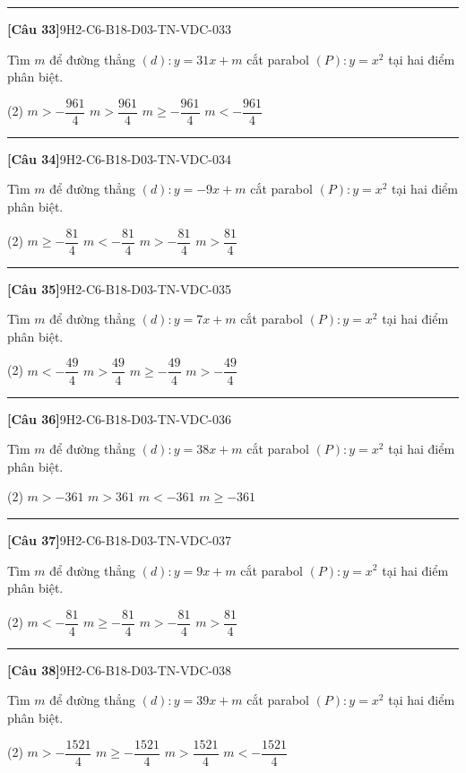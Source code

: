 \documentclass[12pt,a4paper]{article}
\newif\ifloigiai
\newenvironment{cauhoi}[2]{%
  \par\medskip\noindent\rule{\textwidth}{0.4pt}\par\nopagebreak
  \noindent\textbf{[#1]}\hfill{\scriptsize\ttfamily #2}\par\nopagebreak\smallskip}{\par}
\newcommand{\dapan}[1]{\ifloigiai\par\smallskip\noindent\textit{Đáp án:} \textbf{#1}\par\fi}
\begin{document}
\begin{cauhoi}{Câu 33}{9H2-C6-B18-D03-TN-VDC-033}
Tìm $m$ để đường thẳng $(d): y=31x+m$ cắt parabol $(P): y=x^{2}$ tại hai điểm phân biệt.
\begin{tasks}(2)
\task $m>-\dfrac{961}{4}$
\task $m>\dfrac{961}{4}$
\task $m\ge -\dfrac{961}{4}$
\task $m<-\dfrac{961}{4}$
\end{tasks}
\dapan{A}
\end{cauhoi}
\begin{cauhoi}{Câu 34}{9H2-C6-B18-D03-TN-VDC-034}
Tìm $m$ để đường thẳng $(d): y=-9x+m$ cắt parabol $(P): y=x^{2}$ tại hai điểm phân biệt.
\begin{tasks}(2)
\task $m\ge -\dfrac{81}{4}$
\task $m<-\dfrac{81}{4}$
\task $m>-\dfrac{81}{4}$
\task $m>\dfrac{81}{4}$
\end{tasks}
\dapan{C}
\end{cauhoi}
\begin{cauhoi}{Câu 35}{9H2-C6-B18-D03-TN-VDC-035}
Tìm $m$ để đường thẳng $(d): y=7x+m$ cắt parabol $(P): y=x^{2}$ tại hai điểm phân biệt.
\begin{tasks}(2)
\task $m<-\dfrac{49}{4}$
\task $m>\dfrac{49}{4}$
\task $m\ge -\dfrac{49}{4}$
\task $m>-\dfrac{49}{4}$
\end{tasks}
\dapan{D}
\end{cauhoi}
\begin{cauhoi}{Câu 36}{9H2-C6-B18-D03-TN-VDC-036}
Tìm $m$ để đường thẳng $(d): y=38x+m$ cắt parabol $(P): y=x^{2}$ tại hai điểm phân biệt.
\begin{tasks}(2)
\task $m>-361$
\task $m>361$
\task $m<-361$
\task $m\ge -361$
\end{tasks}
\dapan{A}
\end{cauhoi}
\begin{cauhoi}{Câu 37}{9H2-C6-B18-D03-TN-VDC-037}
Tìm $m$ để đường thẳng $(d): y=9x+m$ cắt parabol $(P): y=x^{2}$ tại hai điểm phân biệt.
\begin{tasks}(2)
\task $m<-\dfrac{81}{4}$
\task $m\ge -\dfrac{81}{4}$
\task $m>-\dfrac{81}{4}$
\task $m>\dfrac{81}{4}$
\end{tasks}
\dapan{C}
\end{cauhoi}
\begin{cauhoi}{Câu 38}{9H2-C6-B18-D03-TN-VDC-038}
Tìm $m$ để đường thẳng $(d): y=39x+m$ cắt parabol $(P): y=x^{2}$ tại hai điểm phân biệt.
\begin{tasks}(2)
\task $m>-\dfrac{1521}{4}$
\task $m\ge -\dfrac{1521}{4}$
\task $m>\dfrac{1521}{4}$
\task $m<-\dfrac{1521}{4}$
\end{tasks}
\dapan{A}
\end{cauhoi}
\end{document}
